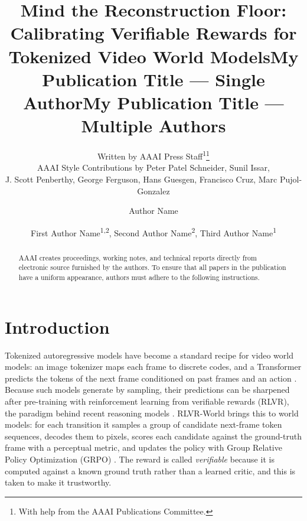 \documentclass[letterpaper]{article} %
\title{Mind the Reconstruction Floor: Calibrating Verifiable Rewards for Tokenized Video World Models}
\author{
    Written by AAAI Press Staff\textsuperscript{\rm 1}\thanks{With help from the AAAI Publications Committee.}\\
    AAAI Style Contributions by Peter Patel Schneider,
    Sunil Issar,\\
    J. Scott Penberthy,
    George Ferguson,
    Hans Guesgen,
    Francisco Cruz\equalcontrib\corresponding,
    Marc Pujol-Gonzalez\equalcontrib\corresponding
}
\title{My Publication Title --- Single Author}
\author {
    Author Name
}
\title{My Publication Title --- Multiple Authors}
\author {
    First Author Name\textsuperscript{\rm 1,\rm 2}\equalcontrib,
    Second Author Name\textsuperscript{\rm 2}\equalcontrib,
    Third Author Name\textsuperscript{\rm 1}\corresponding
}
\begin{document}
\maketitle

\begin{abstract}
AAAI creates proceedings, working notes, and technical reports directly from electronic source furnished by the authors. To ensure that all papers in the publication have a uniform appearance, authors must adhere to the following instructions.
\end{abstract}

\begin{links}
\end{links}

\section{Introduction}
Tokenized autoregressive models have become a standard recipe for video world models: an image tokenizer maps each frame to discrete codes, and a Transformer predicts the tokens of the next frame conditioned on past frames and an action \cite{ivideogpt,genie}. Because such models generate by sampling, their predictions can be sharpened after pre-training with reinforcement learning from verifiable rewards (RLVR), the paradigm behind recent reasoning models \cite{grpo,deepseekr1}. RLVR-World \cite{rlvrworld} brings this to world models: for each transition it samples a group of candidate next-frame token sequences, decodes them to pixels, scores each candidate against the ground-truth frame with a perceptual metric, and updates the policy with Group Relative Policy Optimization (GRPO) \cite{grpo}. The reward is called \emph{verifiable} because it is computed against a known ground truth rather than a learned critic, and this is taken to make it trustworthy.
\end{document}

